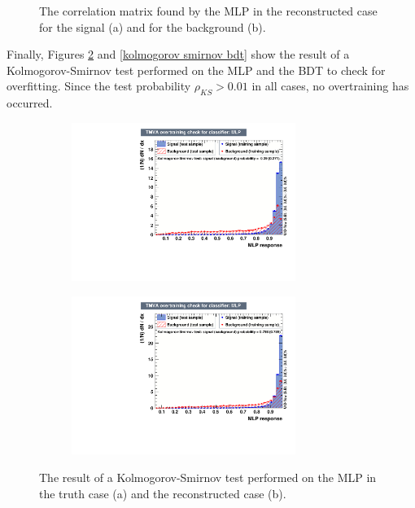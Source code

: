 \documentclass[10pt,a4paper]{book}
\begin{document}
\begin{figure}[h]
\begin{subfigure}{1.0\textwidth}
\caption{}
\end{subfigure}
\caption{The correlation matrix found by the MLP in the reconstructed case for the signal (a) and for the background (b).}
\label{correlation reco}
\end{figure} 

Finally, Figures \ref{kolmogorov smirnov mlp} and \ref{kolmogorov smirnov bdt} show the result of a Kolmogorov-Smirnov test \cite{10.2307/2280095} performed on the MLP and the BDT to check for overfitting. Since the test probability $\rho_{KS} > 0.01$ in all cases, no overtraining has occurred.

\begin{figure}[h]
\begin{subfigure}{1.0\textwidth}
\centering
\includegraphics[width=0.8\textwidth]{ch4_images/ks_mlp_truth.pdf}
\caption{}
\end{subfigure}
\begin{subfigure}{1.0\textwidth}
\centering
\includegraphics[width=0.8\textwidth]{ch4_images/ks_mlp_reco.pdf}
\caption{}
\end{subfigure}
\caption{The result of a Kolmogorov-Smirnov test performed on the MLP in the truth case (a) and the reconstructed case (b).}
\label{kolmogorov smirnov mlp}
\end{figure} 
\end{document}
